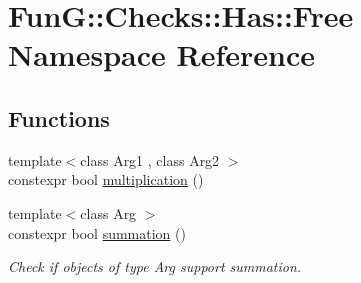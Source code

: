 \hypertarget{namespaceFunG_1_1Checks_1_1Has_1_1Free}{\section{\-Fun\-G\-:\-:\-Checks\-:\-:\-Has\-:\-:\-Free \-Namespace \-Reference}
\label{namespaceFunG_1_1Checks_1_1Has_1_1Free}
}
\subsection*{\-Functions}
\begin{DoxyCompactItemize}
\item 
{\footnotesize template$<$class Arg1 , class Arg2 $>$ }\\constexpr bool \hyperlink{namespaceFunG_1_1Checks_1_1Has_1_1Free_a2454bd1f5873cc86ec31d09d822a67b1}{multiplication} ()
\item 
{\footnotesize template$<$class Arg $>$ }\\constexpr bool \hyperlink{namespaceFunG_1_1Checks_1_1Has_1_1Free_a1cf46f7335354d21dff506aaf812b4f5}{summation} ()
\begin{DoxyCompactList}\small\item\em \-Check if objects of type \-Arg support summation. \end{DoxyCompactList}\end{DoxyCompactItemize}


